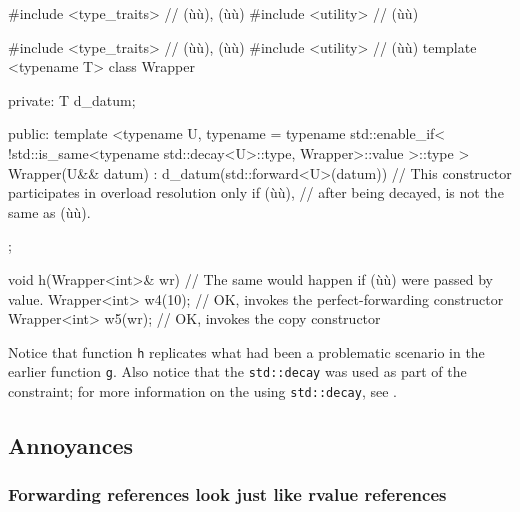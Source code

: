 \begin{emcppshiddenlisting}[emcppsbatch=e19]
#include <type_traits>  // (ù{}ù), (ù{}ù)
#include <utility>  // (ù{}ù)
\end{emcppshiddenlisting}
\begin{emcppslisting}[emcppsbatch=e19]
#include <type_traits> // (ù{}ù),  (ù{}ù)
#include <utility>     // (ù{}ù)
template <typename T>
class Wrapper
{
private:
    T d_datum;

public:
    template <typename U,
        typename = typename std::enable_if<
            !std::is_same<typename std::decay<U>::type, Wrapper>::value
        >::type
    >
    Wrapper(U&& datum) : d_datum(std::forward<U>(datum)) { }
        // This constructor participates in overload resolution only if (ù{}ù),
        // after being decayed, is not the same as (ù{}ù).
};

void h(Wrapper<int>& wr)  // The same would happen if (ù{}ù) were passed by value.
{
    Wrapper<int> w4(10);  // OK, invokes the perfect-forwarding constructor
    Wrapper<int> w5(wr);  // OK, invokes the copy constructor
}
\end{emcppslisting}

\noindent Notice that function \lstinline!h! replicates what had been a problematic scenario in the earlier function \lstinline!g!. Also notice that the \lstinline!std::decay!  was used as
part of the constraint; for more information on the using
\lstinline!std::decay!, see .

\subsection[Annoyances]{Annoyances}\label{annoyances-forwardingref}

\subsubsection[Forwarding references look just like rvalue references]{Forwarding references look just like rvalue references}\label{forwarding-references-look-just-like-rvalue-references}


